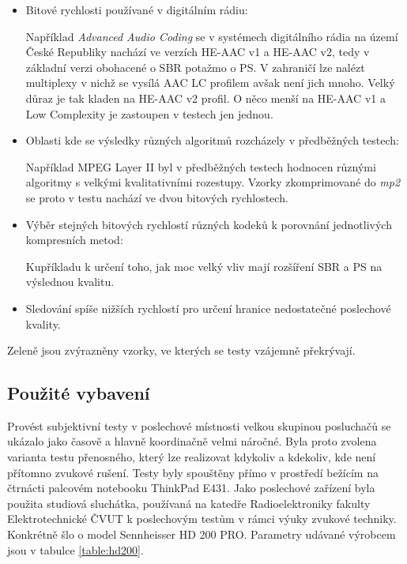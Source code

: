 \begin{itemize}
    \item Bitové rychlosti používané v digitálním rádiu: 
    
    Například \textit{Advanced Audio Coding} se v systémech digitálního rádia na území České Republiky \cite{web:dab:stations} nachází ve verzích HE-AAC v1 a HE-AAC v2, tedy v základní verzi obohacené o SBR potažmo o PS. V zahraničí lze nalézt multiplexy v nichž se vysílá AAC LC profilem avšak není jich mnoho. Velký důraz je tak kladen na HE-AAC v2 profil. O něco menší na HE-AAC v1 a Low Complexity je zastoupen v testech jen jednou.
    
    \item Oblasti kde se výsledky různých algoritmů rozcházely v předběžných testech: 
    
    Například MPEG Layer II byl v předběžných testech hodnocen různými algoritmy s velkými kvalitativními rozestupy. Vzorky zkomprimované do \textit{mp2} se proto v testu nachází ve dvou bitových rychlostech.
   
    \item Výběr stejných bitových rychlostí různých kodeků k porovnání jednotlivých kompresních metod: 
    
    Kupříkladu k určení toho, jak moc velký vliv mají rozšíření SBR a PS na výslednou kvalitu.
    
    \item Sledování spíše nižších rychlostí pro určení hranice nedostatečné poslechové kvality.
    
\end{itemize}

Zeleně jsou zvýrazněny vzorky, ve kterých se testy vzájemně překrývají.

\subsection{Použité vybavení}

Provést subjektivní testy v poslechové místnosti velkou skupinou posluchačů se ukázalo jako časově a hlavně koordinačně velmi náročné. Byla proto zvolena varianta testu přenosného, který lze realizovat kdykoliv a kdekoliv, kde není přítomno zvukové rušení. Testy byly spouštěny přímo v prostředí \matlab bežícím na čtrnácti palcovém notebooku ThinkPad E431. Jako poslechové zařízení byla použita studiová sluchátka, používaná na katedře Radioelektroniky fakulty Elektrotechnické ČVUT k poslechovým testům v rámci výuky zvukové techniky. Konkrétně šlo o model Sennheisser HD 200 PRO. Parametry udávané výrobcem jsou v tabulce \ref{table:hd200}. 

